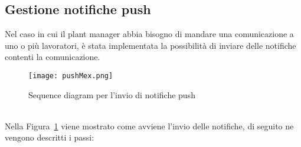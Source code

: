 \subsection{Gestione notifiche push}
Nel caso in cui il \gls{plant manager}\ap{[g]} abbia bisogno di mandare una comunicazione a uno o più lavoratori, è stata implementata la possibilità di inviare delle notifiche contenti la comunicazione.
\begin{figure}[h]
	\begin{center}
		\texttt{[image: pushMex.png]}
		\caption{Sequence diagram per l'invio di notifiche push}\label{fig:push}
	\end{center}
\end{figure}\\
Nella Figura~\ref{fig:push} viene mostrato come avviene l'invio delle notifiche, di seguito ne vengono descritti i passi:
